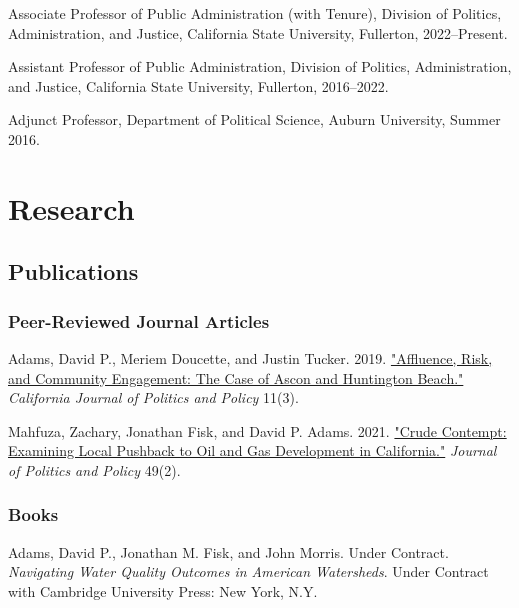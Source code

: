\documentclass[12pt,letterpaper]{article}
\renewenvironment{itemize}{
  \begin{list}{}{
    \setlength{\leftmargin}{1.5em}
    \setlength{\itemsep}{0.25em}
    \setlength{\parskip}{0pt}
    \setlength{\parsep}{0.25em}
  }
}{
  \end{list}
}
\begin{document}
  \begin{itemize}\leftmargin=2pt\itemindent=-15pt\leftmargin=2pt\itemindent=-15pt
      \item Associate Professor of Public Administration (with Tenure), Division of Politics, Administration, and Justice, California State University, Fullerton, 2022--Present. \vspace{0.2cm}
      \item Assistant Professor of Public Administration, Division of Politics, Administration, and Justice, California State University, Fullerton,  2016--2022.\vspace{0.2cm}
      \item Adjunct Professor, Department of Political Science, Auburn University, Summer 2016.
  \end{itemize}

\section*{Research}

\subsection*{Publications}

\subsubsection*{Peer-Reviewed Journal Articles}

\begin{itemize}\leftmargin=2pt\itemindent=-15pt\leftmargin=2pt\itemindent=-15pt

    \item Adams, David P., Meriem Doucette, and Justin Tucker. 2019. \href{https://escholarship.org/uc/item/2mz2n6qk}{"Affluence, Risk, and Community Engagement: The Case of Ascon and Huntington Beach."} \emph{California Journal of Politics and Policy} 11(3).
    
    \item Mahfuza, Zachary, Jonathan Fisk, and David P. Adams. 2021. \href{https://doi.org/10.1111/polp.12401}{"Crude Contempt: Examining Local Pushback to Oil and Gas Development in California."} \emph{Journal of Politics and Policy} 49(2).

  \end{itemize}


\subsubsection*{Books}
\begin{itemize}\leftmargin=2pt\itemindent=-15pt\leftmargin=2pt\itemindent=-15pt
  \item Adams, David P., Jonathan M. Fisk, and John Morris. Under Contract. \emph{Navigating Water Quality Outcomes in American Watersheds}. Under Contract with Cambridge University Press: New York, N.Y.
\end{itemize}
\end{document}
